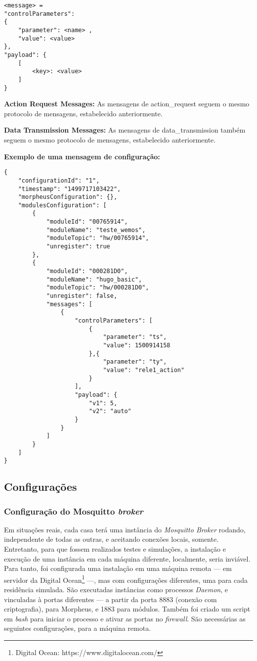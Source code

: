 \begin{lstlisting}
<message> =
"controlParameters":
{
    "parameter": <name> ,
    "value": <value>
},
"payload": {
    [
        <key>: <value>
    ]
}
\end{lstlisting}

\textbf{Action Request Messages:}
As mensagens de action\_request seguem o mesmo protocolo de mensagens, estabelecido anteriormente.

\textbf{Data Transmission Messages:}
As mensagens de data\_transmission também seguem o mesmo protocolo de mensagens, estabelecido anteriormente.

\textbf{Exemplo de uma mensagem de configuração:}

\begin{lstlisting}
{
    "configurationId": "1",
    "timestamp": "1499717103422",
    "morpheusConfiguration": {},   
    "modulesConfiguration": [
        {
            "moduleId": "00765914",
            "moduleName": "teste_wemos",
            "moduleTopic": "hw/00765914",
            "unregister": true
    	},
    	{
            "moduleId": "000281D0",
            "moduleName": "hugo_basic",
            "moduleTopic": "hw/000281D0",
            "unregister": false,
            "messages": [
                {
                    "controlParameters": [
                        {
                            "parameter": "ts",
                            "value": 1500914158
                        },{
                            "parameter": "ty",
                            "value": "rele1_action"
                        }
                    ],
                    "payload": {
                        "v1": 5,
                        "v2": "auto"
                    }
                }
            ]
    	}
    ]
}
\end{lstlisting}

\subsection{Configurações}

\subsubsection{Configuração do \wmqtt{} Mosquitto \emph{broker}}

Em situações reais, cada casa terá uma instância do \emph{Mosquitto Broker} rodando, independente de todas as outras, e aceitando conexões locais, somente. Entretanto, para que fossem realizados testes e simulações, a instalação e execução de uma instância em cada máquina diferente, localmente, seria inviável. Para tanto, foi configurada uma instalação em uma máquina remota --- em servidor da Digital Ocean\footnote{Digital Ocean: https://www.digitalocean.com/} ---, mas com configurações diferentes, uma para cada residência simulada. São executadas instâncias como processos \emph{Daemon}, e vinculadas à portas diferentes --- a partir da porta 8883 (conexão com criptografia), para Morpheus, e 1883 para módulos. Também foi criado um script em \emph{bash} para iniciar o processo e ativar as portas no \emph{firewall}. São necessárias as seguintes configurações, para a máquina remota.

